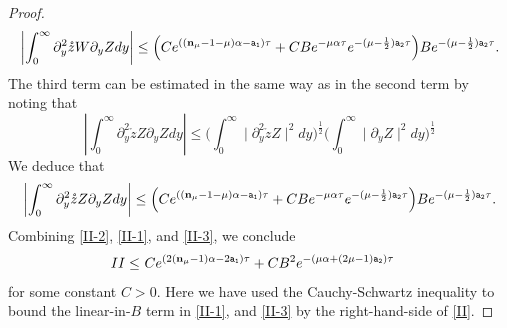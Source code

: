 \documentclass{article}
\newcommand{\al}{\alpha}
\newcommand{\pa}{\partial}
\def\be{\begin{equation}}
\def\ee{\end{equation}}
\def\beqa{\begin{equation}\begin{aligned}}
\def\eeqa{\end{aligned}\end{equation}}
\def\espz{Z}
\def\espw{W}
\def\epone{\mathtt{a_1}}
\def\eptwo{\mathtt{a_2}}
\def\ndmu{{\bf{n}_{\mu}}}
\numberwithin{equation}{section}
\begin{document}
\begin{proof}
	\be\label{II-1}
		\left| \int_{0}^\infty \pa_y^2 \mathring z\espw \pa_y \espz dy \right| \leq \Big( C  e^{((\ndmu-1-\mu)\al -\epone )\tau }+C B e^{-\mu\al\tau}e^{-(\mu-\frac12)\eptwo\tau} \Big) B e^{-(\mu-\frac12)\eptwo\tau}.
	\ee
	The third term can be estimated in the same way as in the second term by noting that
    \[
		\left| \int_{0}^\infty \pa_y^2 \mathring z\espz \pa_y \espz dy \right| \leq \Big(\int_{0}^\infty \mid\pa_y^2 \mathring z  \espz \mid^2  dy\Big)^{\frac12} \Big(\int_{0}^\infty\mid\pa_y \espz \mid^2 dy\Big)^{\frac12}
    \]
    We deduce that 
    \be\label{II-3}
		\left| \int_{0}^\infty \pa_y^2 \mathring z\espz \pa_y \espz dy \right| \leq \Big( C  e^{((\ndmu-1-\mu)\al -\epone )\tau }+C B e^{-\mu\al\tau}e^{-(\mu-\frac12)\eptwo\tau} \Big) B e^{-(\mu-\frac12)\eptwo\tau}.
	\ee
 Combining  \eqref{II-2}, \eqref{II-1}, and \eqref{II-3}, 
         we conclude 
		 \beqa\label{II}
		 	II \leq & \  C e^{( 2(\ndmu-1)\al-2\epone) \tau} 
            + C B^2 e^{-(\mu\al + (2\mu-1)\eptwo)\tau}   
		 \eeqa
	for some constant $C>0$. Here we have used the Cauchy-Schwartz inequality to bound the linear-in-$B$ term in \eqref{II-1}, and \eqref{II-3} by the right-hand-side of \eqref{II}. 
    

\end{proof}
\end{document}
